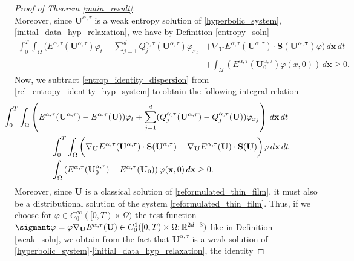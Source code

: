 \documentclass[11pt]{article}
\numberwithin{equation}{section}
\newtheorem{counter example}[theorem]{Counter Example}
\def\bm \sigmant#1{\mathchoice
	{\XXint\displaystyle\textstyle{#1}}%
	{\XXint\textstyle\scriptstyle{#1}}%
	{\XXint\scriptstyle\scriptscriptstyle{#1}}%
	{\XXint\scriptscriptstyle\scriptscriptstyle{#1}}%
	\!\int}
\def\XXint#1#2#3{{\setbox0=\hbox{$#1{#2#3}{\int}$}
		\vcenter{\hbox{$#2#3$}}\kern-.50\wd0}}
\numberwithin{equation}{section}
\numberwithin{equation}{section}
\newcommand{\rel}{^{\alpha, \tau}}
\begin{document}
\begin{proof}[Proof of Theorem \ref{main_result}]
\[\]
Moreover, since $\mathbf{U}\rel$ is a weak entropy solution of  \eqref{hyperbolic_system}, \eqref{initial_data_hyp_relaxation}, we have by Definition \ref{entropy_soln}
\begin{equation}\label{rel_entropy_identity_hyp_system}
\begin{aligned}
\int_{0}^{T}\int_{\Omega} \Bigg(E^{\alpha, \tau}(\mathbf{U}\rel)\varphi_t+\sum_{j=1}^{d}Q^{\alpha, \tau}_j(\mathbf{U}\rel){\varphi_{x_j}}&+\nabla_{\mathbf{U}}E^{\alpha, \tau}(\mathbf{U}\rel)\cdot \mathbf{S(U\rel)}\varphi\Bigg) \, d\mathbf{x}\, dt\\
  &+\int_{\Omega} \left(E^{\alpha, \tau}(\mathbf{U}\rel_0)\varphi(x,0)\right)\, d\mathbf{x}\geq 0. 
 \end{aligned}
\end{equation}
Now, we subtract \eqref{entrop_identity_dispersion} from \eqref{rel_entropy_identity_hyp_system} to obtain the following integral relation
\begin{equation}\label{difference_idenity}
\begin{aligned}
    &\hspace*{-2cm}\int_{0}^{T}\int_{\Omega} \left(E^{\alpha, \tau}(\mathbf{U}\rel)-E^{\alpha, \tau}(\mathbf{{U}}))\varphi_t+\sum_{j=1}^{d}(Q_j^{\alpha, \tau}(\mathbf{U}\rel)-Q^{\alpha, \tau}_j(\mathbf{{U}}))\varphi_{x_j}\right) \, d\mathbf{x}\, dt\\
+&\int_{0}^{T}\int_{\Omega}\bigg(\nabla_{\mathbf{U}}E^{\alpha, \tau}(\mathbf{U}\rel)\cdot \mathbf{S(U\rel)}-\nabla_{\mathbf{{U}}}E^{\alpha, \tau}(\mathbf{{U}})\cdot \mathbf{{S}({U})}\bigg)\varphi \, d\mathbf{x}\, dt\\
+&\int_{\Omega} \left(E^{\alpha, \tau}(\mathbf{U}_0^{\alpha, \tau})-E^{\alpha, \tau}(\mathbf{{U}}_0)\right)\varphi(\mathbf{x}, 0)\, d\mathbf{x}\geq 0. 
\end{aligned}
\end{equation}
Moreover, since $\mathbf{{U}}$ is a classical solution of \eqref{reformulated_thin_film}, it must also be a distributional solution of the system \eqref{reformulated_thin_film}. Thus, if  we  choose  for  $\varphi \in C^\infty_0([0,T) \times \Omega )$ the test function ${\bm \varphi}=\varphi  \nabla_{\mathbf{U}} E^{\alpha, \tau}(\mathbf{{U}})\in  C^1_0([0,T) \times \Omega; \mathbb{R}^{2d+3})$ like in Definition \ref{weak_soln}, we obtain from the fact that $\mathbf{U}\rel$ is a weak solution of \eqref{hyperbolic_system}-\eqref{initial_data_hyp_relaxation}, the identity

\end{proof}
\end{document}

